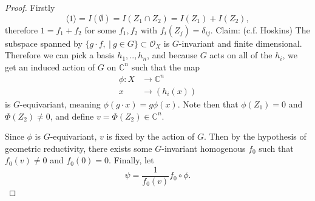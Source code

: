 \documentclass{article}
\theoremstyle{definition}
\newcommand{\C}{\mathbb{C}}
\newcommand{\OO}{\mathcal{O}}
\begin{document}
\begin{proof}
	Firstly
	\begin{equation}
		\langle 1 \rangle = I(\emptyset) = I(Z_1\cap Z_2) = I(Z_1)+I(Z_2),
\end{equation}
therefore $1 = f_1 + f_2$ for some $f_1,f_2$ with $f_i(Z_j)=\delta_{ij}$. Claim: (c.f. Hoskins) The subspace spanned by $\{g\cdot f, ~|~ g\in G\} \subset \OO_X$ is $G$-invariant and finite dimensional. Therefore we can pick a basis $h_1,..,h_n$, and because $G$ acts on all of the $h_i$, we get an induced action of $G$ on $\C^n$ such that the map
\begin{align*}
	\phi:X &\to \C^n\\
	x&\to (h_i(x))
\end{align*}
is $G$-equivariant, meaning $\phi(g\cdot x) = g\phi(x)$.  Note then that $\phi(Z_1)=0$ and $\Phi(Z_2)\neq 0$, and define $v=\Phi(Z_2) \in \C^n$. \vspace{1em}

Since $\phi$ is $G$-equivariant, $v$ is fixed by the action of $G$. Then by the hypothesis of geometric reductivity, there exists some $G$-invariant homogenous $f_0$ such that $f_0(v)\neq 0$ and $f_0(0)=0$. Finally, let 
\begin{equation}
	\psi = \frac{1}{f_0(v)}f_0\circ \phi.
\end{equation}
\end{proof}
\end{document}
